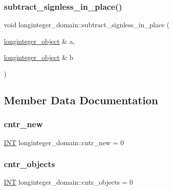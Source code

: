 \subsubsection{\texorpdfstring{subtract\+\_\+signless\+\_\+in\+\_\+place()}{subtract\_signless\_in\_place()}}
{\footnotesize\ttfamily void longinteger\+\_\+domain\+::subtract\+\_\+signless\+\_\+in\+\_\+place (\begin{DoxyParamCaption}\item[{\mbox{\hyperlink{classlonginteger__object}{longinteger\+\_\+object}} \&}]{a,  }\item[{\mbox{\hyperlink{classlonginteger__object}{longinteger\+\_\+object}} \&}]{b }\end{DoxyParamCaption})}



\subsection{Member Data Documentation}
\mbox{\label{classlonginteger__domain_a433596becc62060f7fdce9c7276d5103}} 
\subsubsection{\texorpdfstring{cntr\+\_\+new}{cntr\_new}}
{\footnotesize\ttfamily \mbox{\hyperlink{galois_8h_a09fddde158a3a20bd2dcadb609de11dc}{I\+NT}} longinteger\+\_\+domain\+::cntr\+\_\+new = 0\hspace{0.3cm}{\ttfamily [static]}}

\mbox{\label{classlonginteger__domain_a1e9463dfe45a8476117dd260d3956eaf}} 
\subsubsection{\texorpdfstring{cntr\+\_\+objects}{cntr\_objects}}
{\footnotesize\ttfamily \mbox{\hyperlink{galois_8h_a09fddde158a3a20bd2dcadb609de11dc}{I\+NT}} longinteger\+\_\+domain\+::cntr\+\_\+objects = 0\hspace{0.3cm}{\ttfamily [static]}}


